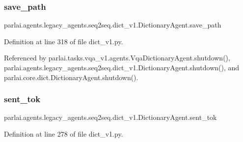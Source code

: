 \subsubsection{\texorpdfstring{save\+\_\+path}{save\_path}}
{\footnotesize\ttfamily parlai.\+agents.\+legacy\+\_\+agents.\+seq2seq.\+dict\+\_\+v1.\+Dictionary\+Agent.\+save\+\_\+path}



Definition at line 318 of file dict\+\_\+v1.\+py.



Referenced by parlai.\+tasks.\+vqa\+\_\+v1.\+agents.\+Vqa\+Dictionary\+Agent.\+shutdown(), parlai.\+agents.\+legacy\+\_\+agents.\+seq2seq.\+dict\+\_\+v1.\+Dictionary\+Agent.\+shutdown(), and parlai.\+core.\+dict.\+Dictionary\+Agent.\+shutdown().

\mbox{\label{classparlai_1_1agents_1_1legacy__agents_1_1seq2seq_1_1dict__v1_1_1DictionaryAgent_a59047632ce2688b8eba1e16f8e74a588}} 
\subsubsection{\texorpdfstring{sent\+\_\+tok}{sent\_tok}}
{\footnotesize\ttfamily parlai.\+agents.\+legacy\+\_\+agents.\+seq2seq.\+dict\+\_\+v1.\+Dictionary\+Agent.\+sent\+\_\+tok}



Definition at line 278 of file dict\+\_\+v1.\+py.




